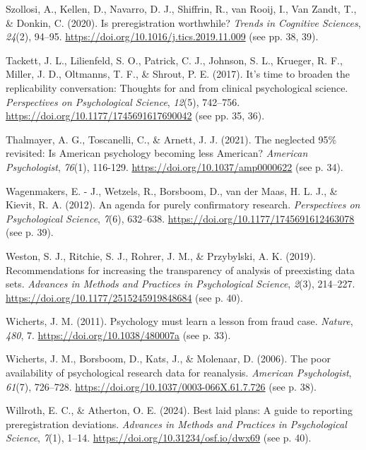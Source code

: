 \documentclass[authordate, empirical,issue]{jote-new-article}
\begin{document}
Szollosi, A., Kellen, D., Navarro, D. J., Shiffrin, R., van Rooij, I., Van Zandt, T., \& Donkin, C. (2020). Is preregistration worthwhile? \emph{Trends in Cognitive Sciences}, \emph{24}(2), 94–95. \url{https://doi.org/10.1016/j.tics.2019.11.009} (see pp. 38, 39).

Tackett, J. L., Lilienfeld, S. O., Patrick, C. J., Johnson, S. L., Krueger, R. F., Miller, J. D., Oltmanns, T. F., \& Shrout, P. E. (2017). It’s time to broaden the replicability conversation: Thoughts for and from clinical psychological science. \emph{Perspectives on Psychological Science}, \emph{12}(5), 742–756. \url{https://doi.org/10.1177/1745691617690042} (see pp. 35, 36).

Thalmayer, A. G., Toscanelli, C., \& Arnett, J. J. (2021). The neglected 95\% revisited: Is American psychology becoming less American? \emph{American Psychologist}, \emph{76}(1), 116-129. \url{https://doi.org/10.1037/amp0000622} (see p. 34).

Wagenmakers, E. - J., Wetzels, R., Borsboom, D., van der Maas, H. L. J., \& Kievit, R. A. (2012). An agenda for purely confirmatory research. \emph{Perspectives on Psychological Science}, \emph{7}(6), 632–638. \url{https://doi.org/10.1177/1745691612463078} (see p. 39).

Weston, S. J., Ritchie, S. J., Rohrer, J. M., \& Przybylski, A. K. (2019). Recommendations for increasing the transparency of analysis of preexisting data sets. \emph{Advances in Methods and Practices in Psychological Science}, \emph{2}(3), 214–227. \url{https://doi.org/10.1177/2515245919848684} (see p. 40).

Wicherts, J. M. (2011). Psychology must learn a lesson from fraud case. \emph{Nature}, \emph{480}, 7. \url{https://doi.org/10.1038/480007a} (see p. 33).

Wicherts, J. M., Borsboom, D., Kats, J., \& Molenaar, D. (2006). The poor availability of psychological research data for reanalysis. \emph{American Psychologist}, \emph{61}(7), 726–728. \url{https://doi.org/10.1037/0003-066X.61.7.726} (see p. 38).

Willroth, E. C., \& Atherton, O. E. (2024). Best laid plans: A guide to reporting preregistration deviations. \emph{Advances in Methods and Practices in Psychological Science}, \emph{7}(1), 1–14. \url{https://doi.org/10.31234/osf.io/dwx69} (see p. 40).
\end{document}
